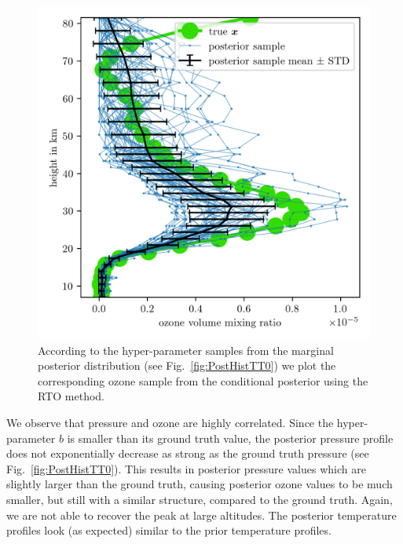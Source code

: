 \begin{figure}[ht!]
	\centering
	\includegraphics{FullO3Res.png}
	\caption[Pressure posterior samples.]{According to the hyper-parameter samples from the marginal posterior distribution (see Fig.~\ref{fig:PostHistTT0}) we plot the corresponding ozone sample from the conditional posterior using the RTO method.}
	\label{fig:O3Post}
\end{figure}

We observe that pressure and ozone are highly correlated.
Since the hyper-parameter $b$ is smaller than its ground truth value, the posterior pressure profile does not exponentially decrease as strong as the ground truth pressure (see Fig.~\ref{fig:PostHistTT0}).
This results in posterior pressure values which are slightly larger than the ground truth, causing posterior ozone values to be much smaller, but still with a similar structure, compared to the ground truth.
Again, we are not able to recover the peak at large altitudes.
The posterior temperature profiles look (as expected) similar to the prior temperature profiles.
\clearpage





